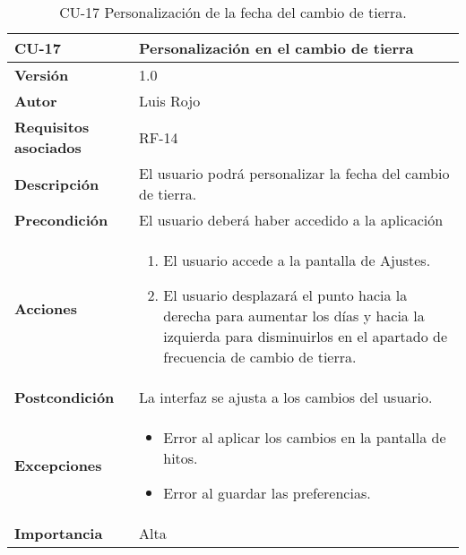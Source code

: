 \begin{table}[p]
	\centering
	\begin{tabularx}{\linewidth}{ p{} p{} }
		\toprule
		\textbf{CU-17}    & \textbf{Personalización en el cambio de tierra}\\
		\toprule
		\textbf{Versión}              & 1.0    \\
		\textbf{Autor}                & Luis Rojo \\
		\textbf{Requisitos asociados} & RF-14 \\
		\textbf{Descripción}          & El usuario podrá personalizar la fecha del cambio de tierra. \\
		\textbf{Precondición}         &  El usuario deberá haber accedido a la aplicación \\
		\textbf{Acciones}             &
		\begin{enumerate}
			\def\labelenumi{\arabic{enumi}.}
			\tightlist
			\item El usuario accede a la pantalla de Ajustes.
                \item El usuario desplazará el punto hacia la derecha para aumentar los días y hacia la izquierda para disminuirlos en el apartado de frecuencia de cambio de tierra.
		\end{enumerate}\\
		\textbf{Postcondición}        & La interfaz se ajusta a los cambios del usuario.  \\
		\textbf{Excepciones}          &  
            \begin{itemize}
                \item Error al aplicar los cambios en la pantalla de hitos.
                \item Error al guardar las preferencias.
            \end{itemize}
           \\
		\textbf{Importancia}          & Alta  \\
		\bottomrule
	\end{tabularx}
	\caption{CU-17 Personalización de la fecha del cambio de tierra.}
\end{table}
